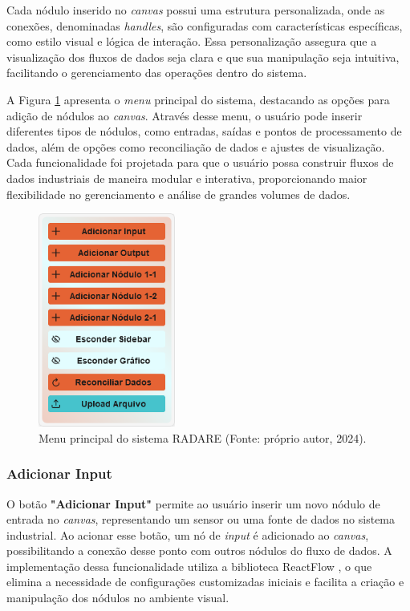 Cada nódulo inserido no \textit{canvas} possui uma estrutura personalizada, onde as conexões, denominadas \textit{handles}, são configuradas com características específicas, como estilo visual e lógica de interação. Essa personalização assegura que a visualização dos fluxos de dados seja clara e que sua manipulação seja intuitiva, facilitando o gerenciamento das operações dentro do sistema.

A Figura \ref{Fig:MenuImage} apresenta o \textit{menu} principal do sistema, destacando as opções para adição de nódulos ao \textit{canvas}. Através desse menu, o usuário pode inserir diferentes tipos de nódulos, como entradas, saídas e pontos de processamento de dados, além de opções como reconciliação de dados e ajustes de visualização. Cada funcionalidade foi projetada para que o usuário possa construir fluxos de dados industriais de maneira modular e interativa, proporcionando maior flexibilidade no gerenciamento e análise de grandes volumes de dados.

\begin{figure}[htbp]
    \centering
    \includegraphics[width=0.4\textwidth]{figuras/menu-image.png}
    \caption{Menu principal do sistema RADARE (Fonte: próprio autor, 2024).}
    \label{Fig:MenuImage}
\end{figure}

\subsubsection{Adicionar Input}

O botão \textbf{"Adicionar Input"} permite ao usuário inserir um novo nódulo de entrada no \textit{canvas}, representando um sensor ou uma fonte de dados no sistema industrial. Ao acionar esse botão, um nó de \textit{input} é adicionado ao \textit{canvas}, possibilitando a conexão desse ponto com outros nódulos do fluxo de dados. A implementação dessa funcionalidade utiliza a biblioteca ReactFlow \cite{reactflow}, o que elimina a necessidade de configurações customizadas iniciais e facilita a criação e manipulação dos nódulos no ambiente visual.

